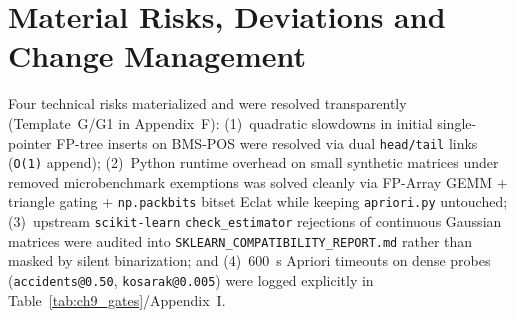 \begin{table}[ht!]
\centering
\caption{Two-Semester Capstone Review-Gate Closure Summary (Template I).}
\label{tab:ch9_gates}
\fontsize{8.2}{10.2}\selectfont
\renewcommand{\arraystretch}{0.85}
\end{table}

\section{Material Risks, Deviations and Change Management}
Four technical risks materialized and were resolved transparently (Template~G/G1 in Appendix~F): (1)~quadratic slowdowns in initial single-pointer FP-tree inserts on BMS-POS were resolved via dual \texttt{head/\protect\allowbreak{}tail} links (\texttt{O(1)} append); (2)~Python runtime overhead on small synthetic matrices under removed microbenchmark exemptions was solved cleanly via FP-Array GEMM + triangle gating + \texttt{np.packbits} bitset Eclat while keeping \texttt{apriori.py} untouched; (3)~upstream \texttt{scikit-learn} \texttt{check\_\protect\allowbreak{}estimator} rejections of continuous Gaussian matrices were audited into \texttt{SKLEARN\_\protect\allowbreak{}COMPATIBILITY\_\protect\allowbreak{}REPORT.md} rather than masked by silent binarization; and (4)~600~s Apriori timeouts on dense probes (\texttt{accidents@0.50}, \texttt{kosarak@0.005}) were logged explicitly in Table~\ref{tab:ch9_gates}/Appendix~I.

